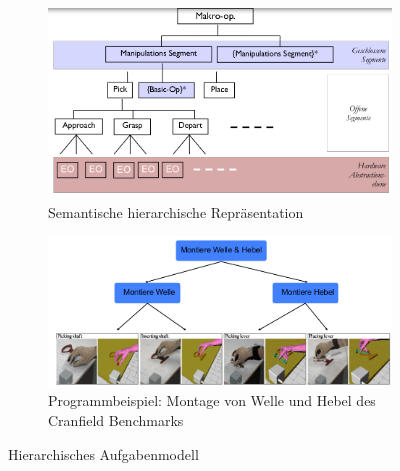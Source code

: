 \begin{figure}[h!]
	\centering
	\begin{subfigure}{.45\textwidth}
		\includegraphics[width=\textwidth]{figures/ch02_hier1.png}
		\caption{Semantische hierarchische Repräsentation}
	\end{subfigure}
	\begin{subfigure}{.45\textwidth}
		\includegraphics[width=\textwidth]{figures/ch02_hier2.png}
		\caption{Programmbeispiel: Montage von Welle und Hebel des Cranfield Benchmarks}
	\end{subfigure}
	\caption{Hierarchisches Aufgabenmodell}
	\label{hiermod}
\end{figure}
